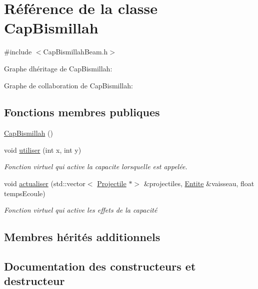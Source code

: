 \hypertarget{class_cap_bismillah}{}\section{Référence de la classe Cap\+Bismillah}
\label{class_cap_bismillah}


{\ttfamily \#include $<$Cap\+Bismillah\+Beam.\+h$>$}



Graphe d\textquotesingle{}héritage de Cap\+Bismillah\+:


Graphe de collaboration de Cap\+Bismillah\+:
\subsection*{Fonctions membres publiques}
\begin{DoxyCompactItemize}
\item 
\hyperlink{class_cap_bismillah_a60ffd96cf478cef48242d934380c7d7e}{Cap\+Bismillah} ()
\item 
void \hyperlink{class_cap_bismillah_a9c3b48cacee26d055f24bf05f669cfca}{utiliser} (int x, int y)
\begin{DoxyCompactList}\small\item\em Fonction virtuel qui active la capacite lorsqu\textquotesingle{}elle est appelée. \end{DoxyCompactList}\item 
void \hyperlink{class_cap_bismillah_aef9579d9a4ee46cc92873ceb6440560a}{actualiser} (std\+::vector$<$ \hyperlink{class_projectile}{Projectile} $\ast$$>$ \&projectiles, \hyperlink{class_entite}{Entite} \&vaisseau, float temps\+Ecoule)
\begin{DoxyCompactList}\small\item\em Fonction virtuel qui active les effets de la capacité \end{DoxyCompactList}\end{DoxyCompactItemize}
\subsection*{Membres hérités additionnels}


\subsection{Documentation des constructeurs et destructeur}
\mbox{\label{class_cap_bismillah_a60ffd96cf478cef48242d934380c7d7e}} 
